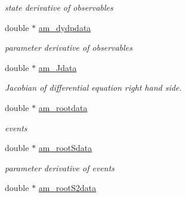 \begin{DoxyCompactItemize}
\begin{DoxyCompactList}\small\item\em state derivative of observables \end{DoxyCompactList}\item 
\hypertarget{struct_return_data_a57a7eb2085d8ed5bb6c62331a2aa3af5}{}double $\ast$ \hyperlink{struct_return_data_a57a7eb2085d8ed5bb6c62331a2aa3af5}{am\+\_\+dydpdata}\label{struct_return_data_a57a7eb2085d8ed5bb6c62331a2aa3af5}

\begin{DoxyCompactList}\small\item\em parameter derivative of observables \end{DoxyCompactList}\item 
\hypertarget{struct_return_data_a82d71415ca06c969ebd22a02e4789b1d}{}double $\ast$ \hyperlink{struct_return_data_a82d71415ca06c969ebd22a02e4789b1d}{am\+\_\+\+Jdata}\label{struct_return_data_a82d71415ca06c969ebd22a02e4789b1d}

\begin{DoxyCompactList}\small\item\em Jacobian of differential equation right hand side. \end{DoxyCompactList}\item 
\hypertarget{struct_return_data_af1a09a94b46b2a4e6b3e90d37a7fdbe3}{}double $\ast$ \hyperlink{struct_return_data_af1a09a94b46b2a4e6b3e90d37a7fdbe3}{am\+\_\+rootdata}\label{struct_return_data_af1a09a94b46b2a4e6b3e90d37a7fdbe3}

\begin{DoxyCompactList}\small\item\em events \end{DoxyCompactList}\item 
\hypertarget{struct_return_data_a98be71879a3ad48c62a203c0a03457f5}{}double $\ast$ \hyperlink{struct_return_data_a98be71879a3ad48c62a203c0a03457f5}{am\+\_\+root\+Sdata}\label{struct_return_data_a98be71879a3ad48c62a203c0a03457f5}

\begin{DoxyCompactList}\small\item\em parameter derivative of events \end{DoxyCompactList}\item 
\hypertarget{struct_return_data_a4d7116a416a12564e8058589889357ba}{}double $\ast$ \hyperlink{struct_return_data_a4d7116a416a12564e8058589889357ba}{am\+\_\+root\+S2data}\label{struct_return_data_a4d7116a416a12564e8058589889357ba}


\end{DoxyCompactItemize}
